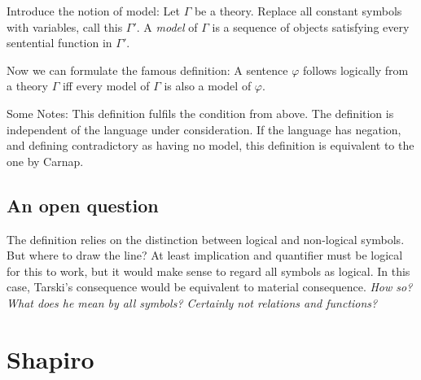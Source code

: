 \documentclass[a4paper]{article}
\begin{document}
Introduce the notion of model:  Let $\Gamma$ be a theory. Replace all constant
symbols with variables, call this $\Gamma'$.  A \emph{model} of $\Gamma$ is a
sequence of objects satisfying every sentential function in $\Gamma'$.

Now we can formulate the famous definition: A sentence $\varphi$ follows
logically from a theory $\Gamma$ iff every model of $\Gamma$ is also a model of
$\varphi$.

Some Notes: This definition fulfils the condition from above.  The definition is
independent of the language under consideration.  If the language has negation,
and defining contradictory as having no model, this definition is equivalent to
the one by Carnap.

\subsection{An open question}

The definition relies on the distinction between logical and non-logical
symbols.  But where to draw the line?  At least implication and quantifier must
be logical for this to work, but it would make sense to regard all symbols as
logical.  In this case, Tarski's consequence would be equivalent to material
consequence.  \emph{How so? What does he mean by \emph{all symbols}? Certainly
not relations and functions?}

\section{Shapiro}



\end{document}
